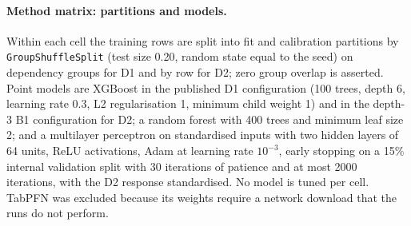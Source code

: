 \documentclass[11pt,a4paper]{article}
\begin{document}
\paragraph{Method matrix: partitions and models.} Within each cell the
training rows are split into fit and calibration partitions by
\texttt{GroupShuffleSplit} (test size 0.20, random state equal to the seed)
on dependency groups for D1 and by row for D2; zero group overlap is
asserted. Point models are XGBoost in the published D1 configuration (100
trees, depth 6, learning rate 0.3, L2 regularisation 1, minimum child weight
1) and in the depth-3 B1 configuration for D2; a random forest with 400 trees
and minimum leaf size 2; and a multilayer perceptron on standardised inputs
with two hidden layers of 64 units, ReLU activations, Adam at learning rate
$10^{-3}$, early stopping on a 15\% internal validation split with 30
iterations of patience and at most 2000 iterations, with the D2 response
standardised. No model is tuned per cell. TabPFN was excluded because its
weights require a network download that the runs do not perform.
\end{document}
